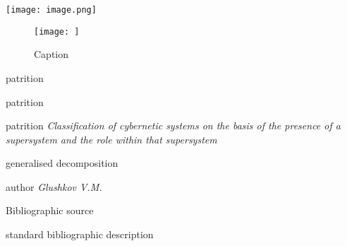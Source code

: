 \documentclass{scndocument}
\begin{document}
\begin{multicols}{2}
\texttt{[image: image.png]}
\begin{figure}
    \centering
    \texttt{[image: ]}
    \caption{Caption}
    \label{fig:enter-la bel}
\end{figure}
\par

\newline
\newline

\normalsize
\begin{scn}
    \begin{scnrelfromset}{patrition}
    \end{scnrelfromset}

    \begin{scnrelfromset}{patrition}
    \end{scnrelfromset}

    \begin{scnrelfromset}{patrition}
    \textit{Classification of cybernetic systems on the basis
of the presence of a supersystem and the role
within that supersystem}
    \end{scnrelfromset}

    \begin{scnrelfromset}{generalised decomposition}
    \end{scnrelfromset}

        \begin{scnrelfromset}{author}
        \textit{Glushkov V.M.}
        \end{scnrelfromset}
        \begin{scnrelfromset}{Bibliographic source}
        \end{scnrelfromset}
        \begin{scnrelfromset}{standard bibliographic description}
        \end{scnrelfromset}
    

\end{scn}
\end{multicols}
\end{document}
